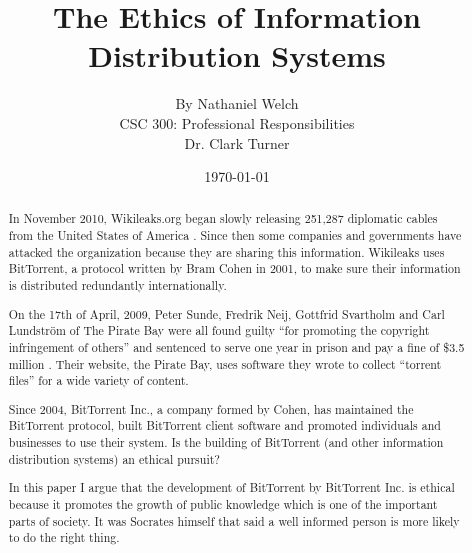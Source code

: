 \documentclass[11pt]{article}
\begin{document}
\title{\vfill The Ethics of Information Distribution Systems} %
\author{
By Nathaniel Welch\vspace{10pt}\\
CSC 300: Professional Responsibilities\vspace{10pt}\\
Dr. Clark Turner\vspace{10pt}\\
}
\date{\today}

\maketitle

\vfill
\begin{abstract}
In November 2010, Wikileaks.org began slowly releasing 251,287 diplomatic cables from the United States of America \cite{cablegate}. Since then some companies and governments have attacked the organization because they are sharing this information. Wikileaks uses BitTorrent, a protocol written by Bram Cohen in 2001, to make sure their information is distributed redundantly internationally.

On the 17th of April, 2009, Peter Sunde, Fredrik Neij, Gottfrid Svartholm and Carl Lundström of The Pirate Bay were all found guilty ``for promoting the copyright infringement of others'' and sentenced to serve one year in prison and pay a fine of \$3.5 million \cite{tpbverdict}. Their website, the Pirate Bay, uses software they wrote to collect ``torrent files'' for a wide variety of content.

Since 2004, BitTorrent Inc., a company formed by Cohen, has maintained the BitTorrent protocol, built BitTorrent client software and promoted individuals and businesses to use their system. Is the building of BitTorrent (and other information distribution systems) an ethical pursuit?

In this paper I argue that the development of BitTorrent by BitTorrent Inc. is ethical because it promotes the growth of public knowledge which is one of the important parts of society. It was Socrates himself that said a well informed person is more likely to do the right thing.
\end{abstract}

\thispagestyle{empty}
\newpage
\doublespacing

\thispagestyle{empty}
\tableofcontents
\newpage

\end{document}
